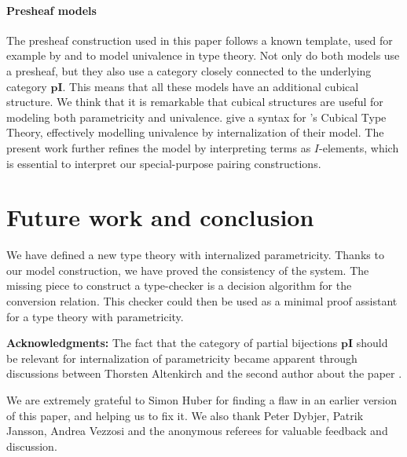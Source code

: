 \documentclass[english]{PaperTools/latex/entcs}
\theoremstyle{plain}
\theoremstyle{definition}
\theoremstyle{remark}
\def\pI{\ensuremath{\mathbf{pI}}}
\begin{document}
\paragraph{Presheaf models}
The presheaf construction used in this paper follows a known template,
used for example by \citet{bezem2014model} and \citet{DBLP:journals/corr/Pitts14}
to model univalence in type theory. Not only do both models use a
presheaf, but they also use a category closely connected to the
underlying category $\pI$.
This means that all these models have an additional cubical structure.
We think that it is remarkable that cubical structures are useful for
modeling both parametricity and univalence.
\citet{altenkirch2014syntax} give a syntax for
\citeauthor{bezem2014model}'s Cubical Type Theory, effectively modelling
univalence by internalization of their model.
The present work further refines the model by interpreting terms as
$I$-elements, which is essential to interpret our special-purpose
pairing constructions.

\section{Future work and conclusion}
We have defined a new type theory with internalized parametricity.
Thanks to our model construction, we have proved the consistency of
the system. The missing piece to construct a type-checker is a
decision algorithm for the conversion relation.  This checker could
then be used as a minimal proof assistant for a type theory with
parametricity.

\bigskip
\noindent
\textbf{Acknowledgments:}
The fact that the category of partial bijections \pI{} should be
relevant for internalization of parametricity became apparent through
discussions between Thorsten Altenkirch and the second  author about
the paper \citep{bernardy_computational_2012}.

We are extremely grateful to Simon Huber for finding a flaw in an
earlier version of this paper, and helping us to fix it.
We also thank Peter Dybjer, Patrik Jansson, Andrea Vezzosi and the
anonymous referees for valuable feedback and discussion.

\newcommand{\newblock}{}


\end{document}
